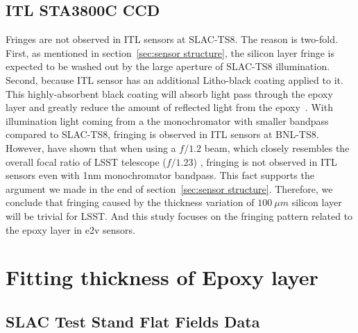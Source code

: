 \documentclass[twocolumn]{aastex63} %
\begin{document}
\begin{CJK*}{UTF8}{gbsn}
\subsection{ITL STA3800C CCD} \label{sec: ITL sensor}
Fringes are not observed in ITL sensors at SLAC-TS8. The reason is two-fold. First, as mentioned in section~\ref{sec:sensor structure}, the silicon layer fringe is expected to be washed out by the large aperture of SLAC-TS8 illumination. Second, because ITL sensor has an additional Litho-black coating applied to it. This highly-absorbent black coating will absorb light pass through the epoxy layer and greatly reduce the amount of reflected light from the epoxy~\citep{Connor22}. With illumination light coming from a the monochromator with smaller bandpass compared to SLAC-TS8, fringing is observed in ITL sensors at BNL-TS8. However, \citet{Craig20} have shown that when using a $f/1.2$ beam, which closely resembles the overall focal ratio of LSST telescope ($f/1.23$) \citep{Ivezi19}, fringing is not observed in ITL sensors even with 1nm monochromator bandpass. This fact supports the argument we made in the end of section~\ref{sec:sensor structure}. Therefore, we conclude that fringing caused by the thickness variation of $100\ \mu m$ silicon layer will be trivial for LSST. And this study focuses on the fringing pattern related to the epoxy layer in e2v sensors.

\section{Fitting thickness of Epoxy layer} \label{sec:Frining_fitting}

\subsection{SLAC Test Stand Flat Fields Data} \label{subsec:SLAC-TS8}


\end{CJK*}
\end{document}
